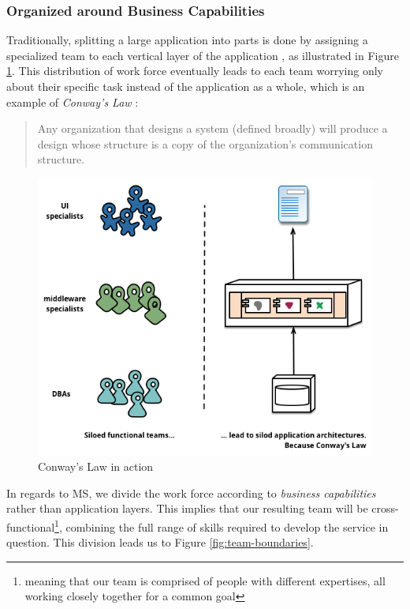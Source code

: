 \subsubsection{Organized around Business Capabilities}
\label{sec:business-capabilities}

Traditionally, splitting a large application into parts is done by
assigning a specialized team to each vertical layer of the application
\cite{ms-challenges}, as illustrated in Figure \ref{fig:conway}. This
distribution of work force eventually leads to each team worrying only
about their specific task instead of the application as a whole, which
is an example of \textit{Conway's Law} \cite{ms-definition}:  

\begin{quote}
	Any organization that designs a system (defined broadly) will
	produce a design whose structure is a copy of the organization's
	communication structure.  
\end{quote}

\begin{figure}
	\centering
	\includegraphics[width=\linewidth]{images/conways-law.png}
	\caption{Conway's Law in action \cite{ms-definition}}
	\label{fig:conway}
\end{figure}

In regards to MS, we divide the work force according to
\textit{business capabilities} rather than application layers. This
implies that our resulting team will be
cross-functional\footnote{meaning that our team is comprised of people
with different expertises, all working closely together for a common
goal}, combining the full range of skills required to develop the
service in question. This division leads us to Figure
\ref{fig:team-boundaries}.

